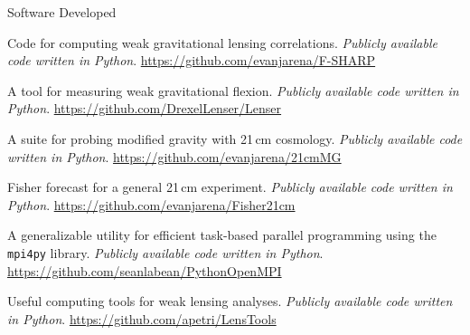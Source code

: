 \documentclass{resume} %
\begin{document}

\begin{rSection}{Software Developed}

\underline{}

\begin{description}[leftmargin=10em, style=nextline]

\item[\texttt{F-SHARP}] Code for computing weak gravitational lensing correlations. \textit{Publicly available code written in Python}. \href{https://github.com/evanjarena/F-SHARP}{https://github.com/evanjarena/F-SHARP}

\item[\texttt{Lenser}] A tool for measuring weak gravitational flexion. \textit{Publicly available code written in Python}. \href{https://github.com/DrexelLenser/Lenser}{https://github.com/DrexelLenser/Lenser}

\item[21cmMG] A suite for probing modified gravity with 21\,cm cosmology. \textit{Publicly available code written in Python}. \href{https://github.com/evanjarena/21cmMG}{https://github.com/evanjarena/21cmMG}

\item[Fisher21cm] Fisher forecast for a general 21\,cm experiment. \textit{Publicly available code written in Python}. \href{https://github.com/evanjarena/Fisher21cm}{https://github.com/evanjarena/Fisher21cm}

\end{description}

\underline{}

\begin{description}[leftmargin=10em, style=nextline]

\item[\texttt{PythonOpenMPI}] A generalizable utility for efficient task-based parallel programming using the \texttt{mpi4py} library. \textit{Publicly available code written in Python}. \\ \href{https://github.com/seanlabean/PythonOpenMPI}{https://github.com/seanlabean/PythonOpenMPI}

\item[\texttt{LensTools}] Useful computing tools for weak lensing analyses. \textit{Publicly available code written in Python}. \href{https://github.com/apetri/LensTools}{https://github.com/apetri/LensTools}

\end{description}

\end{rSection}
\end{document}
